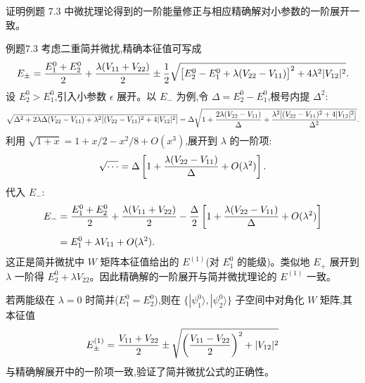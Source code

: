 \begin{question}
证明例题 7.3 中微扰理论得到的一阶能量修正与相应精确解对小参数的一阶展开一致。
\end{question}
\begin{solution}
例题7.3 考虑二重简并微扰,精确本征值可写成
\[
E_\pm={E_1^0+E_2^0\over2}+{\lambda(V_{11}+V_{22})\over2}
\pm{1\over2}\sqrt{\bigl[E_2^0-E_1^0+\lambda(V_{22}-V_{11})\bigr]^2+4\lambda^2|V_{12}|^2}.
\]
设 $E_2^0>E_1^0$,引入小参数 $\epsilon$ 展开。以 $E_-$ 为例,令 $\Delta=E_2^0-E_1^0$,根号内提 $\Delta^2$:
\[
\sqrt{\Delta^2+2\lambda\Delta(V_{22}-V_{11})+\lambda^2[(V_{22}-V_{11})^2+4|V_{12}|^2]}
=\Delta\sqrt{1+{2\lambda(V_{22}-V_{11})\over\Delta}
+{\lambda^2[(V_{22}-V_{11})^2+4|V_{12}|^2]\over\Delta^2}}.
\]
利用 $\sqrt{1+x}=1+x/2-x^2/8+O(x^3)$,展开到 $\lambda$ 的一阶项:
\[
\sqrt{\cdots}=\Delta\left[1+{\lambda(V_{22}-V_{11})\over\Delta}+O(\lambda^2)\right].
\]
代入 $E_-$:
\[
\begin{aligned}
E_-&={E_1^0+E_2^0\over2}+{\lambda(V_{11}+V_{22})\over2}
-{\Delta\over2}\left[1+{\lambda(V_{22}-V_{11})\over\Delta}+O(\lambda^2)\right] \\[4pt]
&=E_1^0+\lambda V_{11}+O(\lambda^2).
\end{aligned}
\]
这正是简并微扰中 $W$ 矩阵本征值给出的 $E^{(1)}$(对 $E_1^0$ 的能级)。类似地 $E_+$ 展开到 $\lambda$ 一阶得 $E_2^0+\lambda V_{22}$。因此精确解的一阶展开与简并微扰理论的 $E^{(1)}$ 一致。

若两能级在 $\lambda=0$ 时简并($E_1^0=E_2^0$),则在 $\{|\psi_1^0\rangle,|\psi_2^0\rangle\}$ 子空间中对角化 $W$ 矩阵,其本征值
\[
E_\pm^{(1)}={V_{11}+V_{22}\over2}\pm\sqrt{\left({V_{11}-V_{22}\over2}\right)^2+|V_{12}|^2}
\]
与精确解展开中的一阶项一致,验证了简并微扰公式的正确性。
\end{solution}

